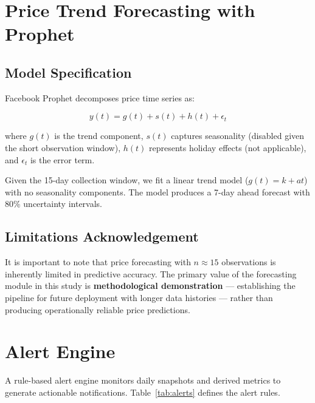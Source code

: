 \section{Price Trend Forecasting with Prophet}

\subsection{Model Specification}

Facebook Prophet \cite{taylor2018forecasting} decomposes price time series as:

\begin{equation}
  y(t) = g(t) + s(t) + h(t) + \epsilon_t
\end{equation}

where $g(t)$ is the trend component, $s(t)$ captures seasonality (disabled given the
short observation window), $h(t)$ represents holiday effects (not applicable), and
$\epsilon_t$ is the error term.

Given the 15-day collection window, we fit a linear trend model ($g(t) = k + at$)
with no seasonality components. The model produces a 7-day ahead forecast with 80\%
uncertainty intervals.

\subsection{Limitations Acknowledgement}

It is important to note that price forecasting with $n \approx 15$ observations is
inherently limited in predictive accuracy. The primary value of the forecasting module
in this study is \textbf{methodological demonstration} — establishing the pipeline
for future deployment with longer data histories — rather than producing operationally
reliable price predictions.

\section{Alert Engine}

A rule-based alert engine monitors daily snapshots and derived metrics to generate
actionable notifications. Table~\ref{tab:alerts} defines the alert rules.

